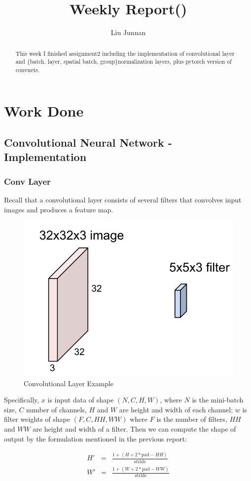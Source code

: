 \documentclass{article} %
\title{Weekly Report()}
\author{
Liu Junnan
}
\begin{document}
	
\maketitle

\begin{abstract}
This week I finished assignment2 including the implementation of convolutional layer and \{batch, layer, spatial batch, group\}normalization layers, plus pytorch version of convnets. 
\end{abstract}

\section{Work Done}
\subsection{Convolutional Neural Network - Implementation}
\subsubsection{Conv Layer}
Recall that a convolutional layer consists of several filters that convolves input images and produces a feature map.
\begin{figure}[H]
	\centering
	\includegraphics[width=.5\textwidth]{convlayer.png}
	\caption{Convolutional Layer Example}
\end{figure}

Specifically, $x$ is input data of shape $(N, C, H, W)$, where $N$ is the mini-batch size, $C$ number of channels, $H$ and $W$ are height and width of each channel; $w$ is filter weights of shape $(F, C, HH, WW)$ where $F$ is the number of filters, $HH$ and $WW$ are height and width of a filter. Then we can compute the shape of output by the formulation mentioned in the previous report:

\begin{eqnarray*}
H' &=& \frac{1 + (H + 2 * \text{pad} - HH)}{\text{stride}}\\
W' &=& \frac{1 + (W + 2 * \text{pad} - WW)}{\text{stride}}
\end{eqnarray*}
\end{document}
